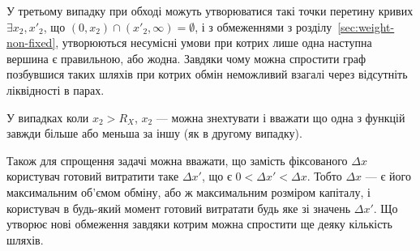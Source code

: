 \documentclass[../index.tex]{subfiles}
\begin{document}
У третьому випадку при обході можуть утворюватися такі точки перетину кривих
$\exists x_{2}, x'_{2}$, що $\left(0, x_{2}\right) \cap{} \left(x'_{2}, \infty{} \right) = \emptyset$,
і з обмеженнями з розділу~\ref{sec:weight-non-fixed}, утворюються несумісні
умови при котрих лише одна наступна вершина є правильною, або жодна. Завдяки
чому можна спростити граф позбувшися таких шляхів при котрих обмін неможливий
взагалі через відсутніть ліквідності в парах.

У випадках коли $x_{2} > R_{X}$, $x_{2}$ --- можна знехтувати і вважати що одна з
функцій завжди більше або меньша за іншу (як в другому випадку).

Також для спрощення задачі можна вважати, що замість фіксованого $\Delta x$
користувач готовий витратити таке $\Delta x'$, що є $0 < \Delta x' < \Delta x$. Тобто $\Delta x$ --- є
його максимальним об'ємом обміну, або ж максимальним розміром капіталу, і
користувач в будь-який момент готовий витратати будь яке зі значень $\Delta x'$. Що
утворює нові обмеження завдяки котрим можна спростити ще деяку кількість шляхів.
\end{document}
